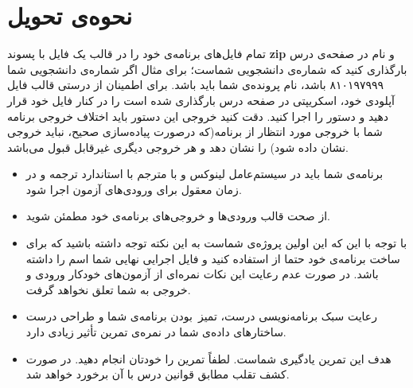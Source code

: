 \documentclass{utap}
\begin{document}
	\section{نحوه‌ی تحویل}
	\hspace{5mm}
	تمام فایل‌های برنامه‌ی خود را در قالب یک فایل با پسوند \textbf{zip} و نام  در صفحه‌ی  درس بارگذاری کنید که  شماره‌ی دانشجویی شماست؛ برای مثال اگر شماره‌ی دانشجویی شما ۸۱۰۱۹۷۹۹۹ باشد، نام پرونده‌ی شما باید  باشد. 
	\newline
	برای اطمینان از درستی قالب فایل آپلودی خود، اسکریپتی در صفحه درس بارگذاری شده است را در کنار فایل خود قرار دهید و دستور
	را اجرا کنید. دقت کنید خروجی این دستور باید اختلاف خروجی برنامه شما با خروجی مورد انتظار از برنامه(که درصورت پیاده‌سازی صحیح، نباید خروجی نشان داده شود) را نشان دهد و هر خروجی دیگری غیرقابل قبول می‌باشد.
	\begin{itemize}
		\item برنامه‌ی شما باید در سیستم‌عامل لینوکس و با مترجم  با استاندارد  ترجمه و در زمان معقول برای ورودی‌های آزمون اجرا شود.
		\item از صحت قالب ورودی‌ها و خروجی‌های برنامه‌ی خود مطمئن شوید.
		\item با توجه با این که این اولین پروژه‌ی  شماست به این نکته توجه داشته باشید که برای ساخت برنامه‌ی خود حتما از  استفاده کنید و فایل اجرایی نهایی شما اسم  را داشته باشد. در صورت عدم رعایت این نکات نمره‌ای از آزمون‌های خودکار ورودی و خروجی به شما تعلق نخواهد گرفت.
		\item رعایت سبک برنامه‌نویسی درست، تمیز~بودن برنامه‌ی شما و طراحی درست ساختار‌های داده‌ی شما در نمره‌ی تمرین تأثیر زیادی دارد.
		\item هدف این تمرین یادگیری شماست. لطفاً تمرین را خودتان انجام دهید. در صورت کشف تقلب مطابق قوانین درس با آن برخورد خواهد شد.
	\end{itemize}
	
	
\end{document}
